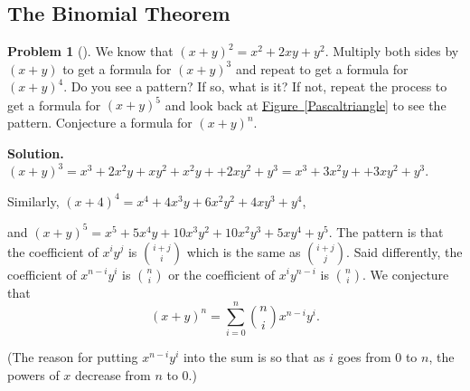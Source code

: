 \documentclass[10pt,]{book}
\theoremstyle{plain}
\theoremstyle{definition}
\newtheorem{activity}[project]{Problem}
\theoremstyle{definition}
\numberwithin{equation}{chapter}
\begin{document}
\typeout{************************************************}
\typeout{************************************************}
\subsection[{The Binomial Theorem}]{The Binomial Theorem}\label{subsection-2}
\begin{activity}[]\label{Conjecturebinomthm}
We know that \((x+y)^2 = x^2+2xy+y^2\). Multiply both sides by \((x+y)\) to get a formula for \((x+y)^3\) and repeat to get a formula for \((x+y)^4\). Do you see a pattern? If so, what is it? If not, repeat the process to get a formula for \((x+y)^5\) and look back at \hyperref[Pascaltriangle]{Figure~\ref{Pascaltriangle}} to see the pattern. Conjecture a formula for \((x+y)^n\).%
\par\medskip\noindent%
\textbf{Solution.}\quad \((x+y)^3=x^3+2x^2y +xy^2+x^2y+ +2xy^2 +y^3=x^3+3x^2y++3xy^2+y^3\).%
\par
Similarly, \((x+4)^4=x^4+4x^3y+6x^2y^2+4xy^3+y^4\),%
\par
and \((x+y)^5=x^5+5x^4y+10x^3y^2+10x^2y^3+5xy^4+y^5.\) The pattern is that the coefficient of \(x^iy^j\) is \(\binom{i+j}{i}\) which is the same as \(\binom{i+j}{j}\). Said differently, the coefficient of \(x^{n-i}y^i\) is \(\binom{n}{i}\) or the coefficient of \(x^iy^{n-i}\) is \(\binom{n}{i}\). We conjecture that%
\begin{equation*}
(x+y)^n=\sum_{i=0}^n \binom{n}{i}x^{n-i}y^i.
\end{equation*}
%
\par
(The reason for putting \(x^{n-i}y^i\) into the sum is so that as \(i\) goes from 0 to \(n\), the powers of \(x\) decrease from \(n\) to 0.)%
\end{activity}
\end{document}
